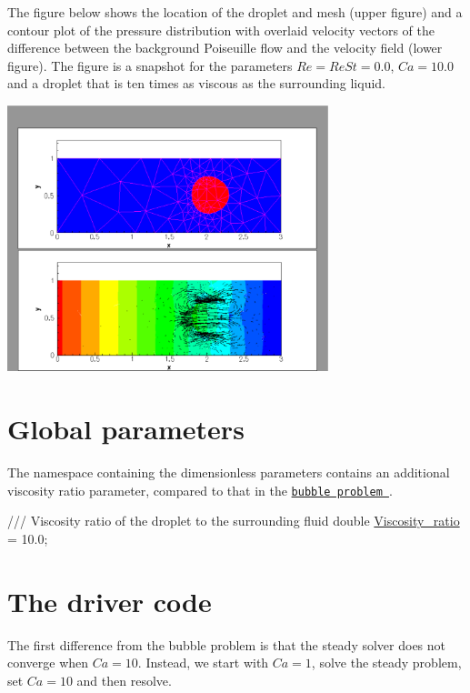 The figure below shows the location of the droplet and mesh (upper figure) and a contour plot of the pressure distribution with overlaid velocity vectors of the difference between the background Poiseuille flow and the velocity field (lower figure). The figure is a snapshot for the parameters $ Re = ReSt = 0.0 $, $ Ca = 10.0 $ and a droplet that is ten times as viscous as the surrounding liquid.

 
\begin{DoxyImage}
\includegraphics[width=0.7\textwidth]{drop_snapshot}
\end{DoxyImage}




 

\hypertarget{index_parameters}{}\section{Global parameters}\label{index_parameters}
The namespace containing the dimensionless parameters contains an additional viscosity ratio parameter, compared to that in the \href{../../adaptive_bubble_in_channel/html/index.html}{\tt bubble problem }.

 
\begin{DoxyCodeInclude}
  \textcolor{comment}{/// Viscosity ratio of the droplet to the surrounding fluid}
  \textcolor{keywordtype}{double} \hyperlink{namespaceProblem__Parameter_afdb95f68bd3c77e4c12001a29bd26e31}{Viscosity\_ratio} = 10.0;

\end{DoxyCodeInclude}




 

\hypertarget{index_main}{}\section{The driver code}\label{index_main}
The first difference from the bubble problem is that the steady solver does not converge when $ Ca = 10 $. Instead, we start with $ Ca = 1 $, solve the steady problem, set $ Ca=10$ and then resolve.



